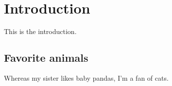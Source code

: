 \chapter{Introduction}
This is the introduction.

\section{Favorite animals}
Whereas my sister likes baby pandas, I'm a fan of cats.

